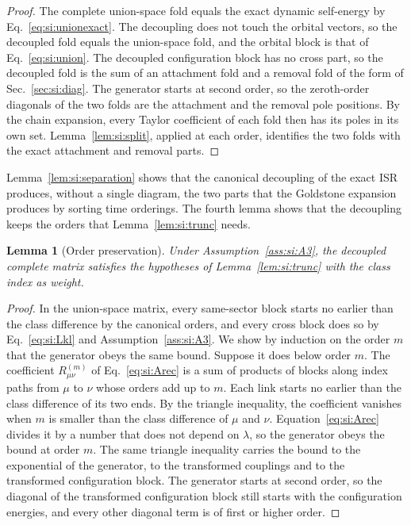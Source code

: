 \documentclass[aip,jcp,reprint,noshowkeys,superscriptaddress]{revtex4-2}
\theoremstyle{plain}
\newtheorem{lemma}{Lemma}
\theoremstyle{definition}
\theoremstyle{remark}
\begin{document}
\begin{proof}
The complete union-space fold equals the exact dynamic self-energy by
Eq.~\eqref{eq:si:unionexact}. The decoupling does not touch the orbital
vectors, so the decoupled fold equals the union-space fold, and the orbital
block is that of Eq.~\eqref{eq:si:union}. The decoupled configuration block has
no cross part, so the decoupled fold is the sum of an attachment fold and a
removal fold of the form of Sec.~\ref{sec:si:diag}. The generator starts at second order,
so the zeroth-order diagonals of the two folds are the attachment and the
removal pole positions. By the chain expansion, every Taylor coefficient of
each fold then has its poles in its own set. Lemma~\ref{lem:si:split}, applied
at each order, identifies the two folds with the exact attachment and removal
parts.
\end{proof}

Lemma~\ref{lem:si:separation} shows that the canonical decoupling of the exact
ISR produces, without a single diagram, the two parts that the Goldstone
expansion produces by sorting time orderings. The fourth lemma shows that the
decoupling keeps the orders that Lemma~\ref{lem:si:trunc} needs.

\begin{lemma}[Order preservation]
\label{lem:si:orders}
Under Assumption~\ref{ass:si:A3}, the decoupled complete matrix satisfies the
hypotheses of Lemma~\ref{lem:si:trunc} with the class index as weight.
\end{lemma}

\begin{proof}
In the union-space matrix, every same-sector block starts no earlier than the
class difference by the canonical orders, and every cross block does so by
Eq.~\eqref{eq:si:Lkl} and Assumption~\ref{ass:si:A3}. We show by induction on
the order $m$ that the generator obeys the same bound. Suppose it does below
order $m$. The coefficient $R^{(m)}_{\mu\nu}$ of Eq.~\eqref{eq:si:Arec} is a
sum of products of blocks along index paths from $\mu$ to $\nu$ whose orders
add up to $m$. Each link starts no earlier than the class difference of its two
ends. By the triangle inequality, the coefficient vanishes when $m$ is smaller
than the class difference of $\mu$ and $\nu$. Equation~\eqref{eq:si:Arec}
divides it by a number that does not depend on $\lambda$, so the generator obeys
the bound at order $m$. The same triangle inequality carries the bound to the
exponential of the generator, to the transformed couplings and to the
transformed configuration block. The generator starts at second order, so the
diagonal of the transformed configuration block still starts with the
configuration energies, and every other diagonal term is of first or higher
order.
\end{proof}
\end{document}
